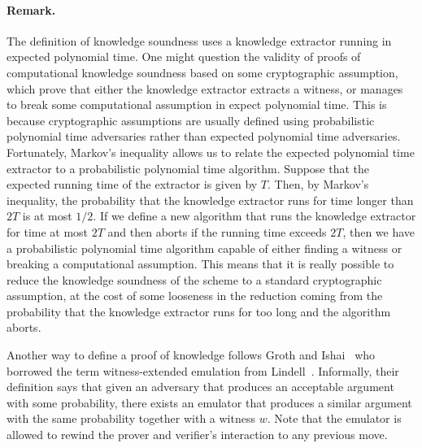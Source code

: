 \paragraph{Remark.} The definition of knowledge soundness uses a knowledge extractor running in expected polynomial time. One might question the validity of proofs of computational knowledge soundness based on some cryptographic assumption, which prove that either the knowledge extractor extracts a witness, or manages to break some computational assumption in expect polynomial time. This is because cryptographic assumptions are usually defined using probabilistic polynomial time adversaries rather than expected polynomial time adversaries. Fortunately, Markov's inequality allows us to relate the expected polynomial time extractor to a probabilistic polynomial time algorithm. Suppose that the expected running time of the extractor is given by $T$. Then, by Markov's inequality, the probability that the knowledge extractor runs for time longer than $2T$ is at most $1/2$. If we define a new algorithm that runs the knowledge extractor for time at most $2T$ and then aborts if the running time exceeds $2T$, then we have a probabilistic polynomial time algorithm capable of either finding a witness or breaking a computational assumption. This means that it is really possible to reduce the knowledge soundness of the scheme to a standard cryptographic assumption, at the cost of some looseness in the reduction coming from the probability that the knowledge extractor runs for too long and the algorithm aborts.

Another way to define a proof of knowledge follows Groth and Ishai~\cite{GrI08} who borrowed the term witness-extended emulation from Lindell~\cite{Lin03}. Informally, their definition says that given an adversary that produces an acceptable argument with some probability, there exists an emulator that produces a similar argument with the same probability together with a witness $w$. Note that the emulator is allowed to rewind the prover and verifier's interaction to any previous move.


